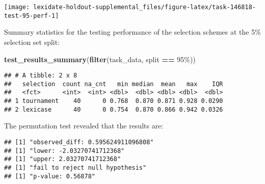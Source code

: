 \documentclass[
]{book}
\newenvironment{Shaded}{\begin{snugshade}}{\end{snugshade}}
\newcommand{\AttributeTok}[1]{\textcolor[rgb]{0.13,0.29,0.53}{#1}}
\newcommand{\DecValTok}[1]{\textcolor[rgb]{0.00,0.00,0.81}{#1}}
\newcommand{\FunctionTok}[1]{\textcolor[rgb]{0.13,0.29,0.53}{\textbf{#1}}}
\newcommand{\NormalTok}[1]{#1}
\newcommand{\OtherTok}[1]{\textcolor[rgb]{0.56,0.35,0.01}{#1}}
\newcommand{\SpecialCharTok}[1]{\textcolor[rgb]{0.81,0.36,0.00}{\textbf{#1}}}
\newcommand{\StringTok}[1]{\textcolor[rgb]{0.31,0.60,0.02}{#1}}
\begin{document}
\texttt{[image: lexidate-holdout-supplemental\_files/figure-latex/task-146818-test-95-perf-1]}

Summary statistics for the testing performance of the selection schemes at the 5\% selection set split:

\begin{Shaded}
\begin{Highlighting}[]
\FunctionTok{test\_results\_summary}\NormalTok{(}\FunctionTok{filter}\NormalTok{(task\_data, split }\SpecialCharTok{==} \StringTok{\textquotesingle{}95\%\textquotesingle{}}\NormalTok{))}
\end{Highlighting}
\end{Shaded}

\begin{verbatim}
## # A tibble: 2 x 8
##   selection  count na_cnt   min median  mean   max    IQR
##   <fct>      <int>  <int> <dbl>  <dbl> <dbl> <dbl>  <dbl>
## 1 tournament    40      0 0.768  0.870 0.871 0.928 0.0290
## 2 lexicase      40      0 0.754  0.870 0.866 0.942 0.0326
\end{verbatim}

The permutation test revealed that the results are:

\begin{Shaded}
\end{Shaded}

\begin{verbatim}
## [1] "observed_diff: 0.595624911096808"
## [1] "lower: -2.03270741712368"
## [1] "upper: 2.03270741712368"
## [1] "fail to reject null hypothesis"
## [1] "p-value: 0.56878"
\end{verbatim}
\end{document}
